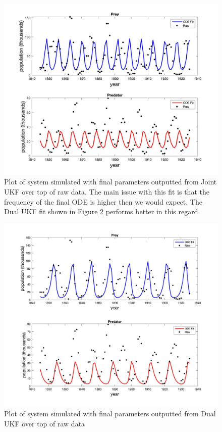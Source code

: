 \begin{figure}[H]
    \centering
    \includegraphics[width=15cm]{Kalman_Filter_Images/LV_Joint_ODEFits.jpg}
    \caption{Plot of system simulated with final parameters outputted from Joint UKF over top of raw data. The main issue with this fit is that the frequency of the final ODE is higher then we would expect. The Dual UKF fit shown in Figure \ref{fig:LV_Dual_ODESims} performs better in this regard.}
    \label{fig:LV_Joint_ODESims}
\end{figure}

\begin{figure}[H]
    \centering
    \includegraphics[width=15cm]{Kalman_Filter_Images/Lv_Dual_ODEFits.jpg}
    \caption{Plot of system simulated with final parameters outputted from Dual UKF over top of raw data}
    \label{fig:LV_Dual_ODESims}
\end{figure}

